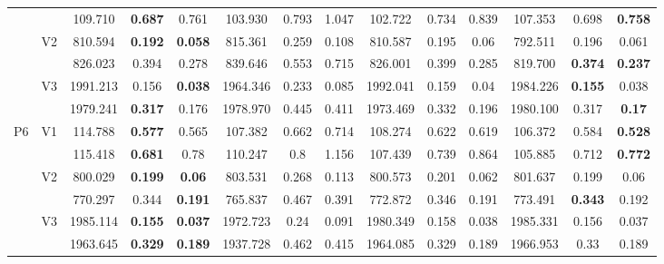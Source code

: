 \documentclass[12pt,a4paper]{article}
\begin{document}
\begin{sidewaystable}[ht]
{\begin{tabular}{cc|ccc|ccc|ccc|ccc|}
   &  & 109.710 & \textbf{0.687} & 0.761 & 103.930 & 0.793 & 1.047 & 102.722 & 0.734 & 0.839 & 107.353 & 0.698 & \textbf{0.758} \\ 
   & \multirow{2}{*}{V2} & 810.594 & \textbf{0.192} & \textbf{0.058} & 815.361 & 0.259 & 0.108 & 810.587 & 0.195 & 0.06 & 792.511 & 0.196 & 0.061 \\ 
   &  & 826.023 & 0.394 & 0.278 & 839.646 & 0.553 & 0.715 & 826.001 & 0.399 & 0.285 & 819.700 & \textbf{0.374} & \textbf{0.237} \\ 
   & \multirow{2}{*}{V3} & 1991.213 & 0.156 & \textbf{0.038} & 1964.346 & 0.233 & 0.085 & 1992.041 & 0.159 & 0.04 & 1984.226 & \textbf{0.155} & 0.038 \\ 
   &  & 1979.241 & \textbf{0.317} & 0.176 & 1978.970 & 0.445 & 0.411 & 1973.469 & 0.332 & 0.196 & 1980.100 & 0.317 & \textbf{0.17} \\ 
   \hline \hline\multirow{6}{*}{P6} & \multirow{2}{*}{V1} & 114.788 & \textbf{0.577} & 0.565 & 107.382 & 0.662 & 0.714 & 108.274 & 0.622 & 0.619 & 106.372 & 0.584 & \textbf{0.528} \\ 
   &  & 115.418 & \textbf{0.681} & 0.78 & 110.247 & 0.8 & 1.156 & 107.439 & 0.739 & 0.864 & 105.885 & 0.712 & \textbf{0.772} \\ 
   & \multirow{2}{*}{V2} & 800.029 & \textbf{0.199} & \textbf{0.06} & 803.531 & 0.268 & 0.113 & 800.573 & 0.201 & 0.062 & 801.637 & 0.199 & 0.06 \\ 
   &  & 770.297 & 0.344 & \textbf{0.191} & 765.837 & 0.467 & 0.391 & 772.872 & 0.346 & 0.191 & 773.491 & \textbf{0.343} & 0.192 \\ 
   & \multirow{2}{*}{V3} & 1985.114 & \textbf{0.155} & \textbf{0.037} & 1972.723 & 0.24 & 0.091 & 1980.349 & 0.158 & 0.038 & 1985.331 & 0.156 & 0.037 \\ 
   &  & 1963.645 & \textbf{0.329} & \textbf{0.189} & 1937.728 & 0.462 & 0.415 & 1964.085 & 0.329 & 0.189 & 1966.953 & 0.33 & 0.189 \\ 
   \hline
\end{tabular}
}
\end{sidewaystable}
\end{document}
